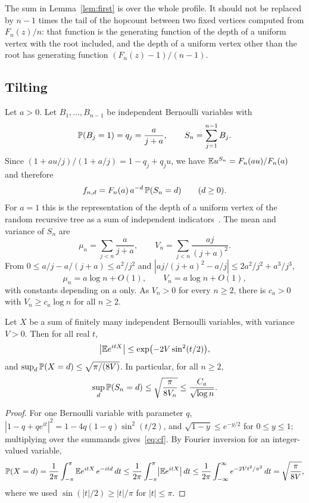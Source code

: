 The sum in Lemma~\ref{lem:first} is over the whole profile. It should not be replaced by $n-1$ times the tail of the
hopcount between two fixed vertices computed from $F_n(z)/n$: that function is the generating function of the depth
of a uniform vertex with the root included, and the depth of a uniform vertex other than the root has generating
function $(F_n(z)-1)/(n-1)$.

\subsection*{Tilting}
Let $a>0$. Let $B_1,\dots,B_{n-1}$ be independent Bernoulli variables with
\[
\mathbb{P}(B_j=1)=q_j=\frac{a}{j+a},\qquad S_n=\sum_{j=1}^{n-1}B_j .
\]
Since $(1+au/j)/(1+a/j)=1-q_j+q_ju$, we have $\mathbb{E} u^{S_n}=F_n(au)/F_n(a)$ and therefore
\begin{equation}\label{eq:tilt}
f_{n,d}=F_n(a)\,a^{-d}\,\mathbb{P}(S_n=d)\qquad(d\ge0).
\end{equation}
For $a=1$ this is the representation of the depth of a uniform vertex of the random recursive tree as a sum of
independent indicators~\cite{Devroye88}.
The mean and variance of $S_n$ are
\[
\mu_n=\sum_{j<n}\frac{a}{j+a},\qquad V_n=\sum_{j<n}\frac{aj}{(j+a)^2} .
\]
From $0\le a/j-a/(j+a)\le a^2/j^2$ and $|aj/(j+a)^2-a/j|\le 2a^2/j^2+a^3/j^3$,
\begin{equation}\label{eq:muV}
\mu_n=a\log n+O(1),\qquad V_n=a\log n+O(1),
\end{equation}
with constants depending on $a$ only. As $V_n>0$ for every $n\ge2$, there is $c_a>0$ with $V_n\ge c_a\log n$ for all
$n\ge2$.

\begin{lemma}\label{lem:atom}
Let $X$ be a sum of finitely many independent Bernoulli variables, with variance $V>0$. Then for all real $t$,
\begin{equation}\label{eq:cf}
\bigl|\mathbb{E} e^{itX}\bigr|\le\exp\bigl(-2V\sin^2(t/2)\bigr),
\end{equation}
and $\sup_{d}\mathbb{P}(X=d)\le\sqrt{\pi/(8V)}$. In particular, for all $n\ge2$,
\begin{equation}\label{eq:atom}
\sup_{d}\mathbb{P}(S_n=d)\le\sqrt{\frac{\pi}{8V_n}}\le\frac{C_a}{\sqrt{\log n}} .
\end{equation}
\end{lemma}

\begin{proof}
For one Bernoulli variable with parameter $q$, $|1-q+qe^{it}|^2=1-4q(1-q)\sin^2(t/2)$, and
$\sqrt{1-y}\le e^{-y/2}$ for $0\le y\le1$; multiplying over the summands gives~\eqref{eq:cf}. By Fourier inversion
for an integer-valued variable,
\[
\mathbb{P}(X=d)=\frac1{2\pi}\int_{-\pi}^{\pi}\mathbb{E} e^{itX}\,e^{-itd}\,dt
\le\frac1{2\pi}\int_{-\pi}^{\pi}\bigl|\mathbb{E} e^{itX}\bigr|\,dt
\le\frac1{2\pi}\int_{-\infty}^{\infty}e^{-2Vt^2/\pi^2}\,dt=\sqrt{\frac{\pi}{8V}},
\]
where we used $\sin(|t|/2)\ge|t|/\pi$ for $|t|\le\pi$.
\end{proof}
